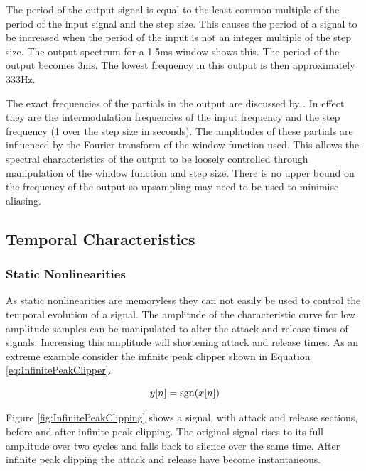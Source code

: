 			The period of the output signal is equal to the least common multiple of the period of the input
			signal and the step size. This causes the period of a signal to be increased when the period of the
			input is not an integer multiple of the step size. The output spectrum for a 1.5ms window shows
			this. The period of the output becomes 3ms. The lowest frequency in this output is then
			approximately 333Hz.

			The exact frequencies of the partials in the output are discussed by \citet{kim2014shorttime}. In
			effect they are the intermodulation frequencies of the input frequency and the step frequency (1
			over the step size in seconds). The amplitudes of these partials are influenced by the Fourier
			transform of the window function used. This allows the spectral characteristics of the output to be
			loosely controlled through manipulation of the window function and step size. There is no upper
			bound on the frequency of the output so upsampling may need to be used to minimise aliasing.

	\subsection{Temporal Characteristics}
	\label{sec:ExcitationEvaluation-Comparison-TemporalCharacteristics}
		\subsubsection*{Static Nonlinearities}
			As static nonlinearities are memoryless they can not easily be used to control the temporal
			evolution of a signal. The amplitude of the characteristic curve for low amplitude samples can be
			manipulated to alter the attack and release times of signals. Increasing this amplitude will
			shortening attack and release times. As an extreme example consider the infinite peak clipper shown
			in Equation \ref{eq:InfinitePeakClipper}.

			\begin{equation}
				y[n] = \operatorname{sgn}(x[n])
				\label{eq:InfinitePeakClipper}
			\end{equation}
			
			Figure \ref{fig:InfinitePeakClipping} shows a signal, with attack and release sections, before and
			after infinite peak clipping. The original signal rises to its full amplitude over two cycles and
			falls back to silence over the same time. After infinite peak clipping the attack and release have
			become instantaneous.

